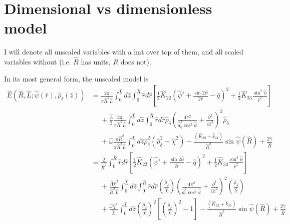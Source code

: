 \documentclass[12pt]{article}
\begin{document}


\section{Dimensional vs dimensionless model}
I will denote all unscaled variables with a hat over top of them, and all scaled variables without (i.e. $\hat{R}$ has units, $R$ does not).

In its most general form, the unscaled model is
\begin{align}\label{eq:generalunits}
\hat{E}(\hat{R},\hat{L};\hat{\psi}(\hat{r}),\hat{\rho}_{\delta}(\hat{z}))&=\frac{2\pi}{\pi\hat{R}^2\hat{L}}\int_0^{\hat{L}}d\hat{z}\int_0^{\hat{R}}\hat{r}d\hat{r}\left[\frac{1}{2}\hat{K}_{22}\left(\hat{\psi}'+\frac{\sin2\hat{\psi}}{2\hat{r}}-\hat{q}\right)^2+\frac{1}{2}\hat{K}_{33}\frac{\sin^4\hat{\psi}}{\hat{r}^2}\right]\nonumber\\
&\phantom{=}+\frac{\hat{\Lambda}}{2}\frac{2\pi}{\pi\hat{R}^2\hat{L}}\int_0^{\hat{L}}d\hat{z}\int_0^{\hat{R}}\hat{r}d\hat{r}\hat{\rho}_{\delta}\left(\frac{4\pi^2}{\hat{d}^2_0\cos^2\hat{\psi}}+\frac{\partial^2}{\partial\hat{z}^2}\right)^2\hat{\rho}_{\delta}\nonumber\\
&\phantom{=}+\hat{\omega}\frac{\pi\hat{R}^2}{\pi\hat{R}^2\hat{L}}\int_0^{\hat{L}}d\hat{z}\hat{\rho}_{\delta}^2\left(\hat{\rho}_{\delta}^2-\hat{\chi}^2\right)-\frac{(\hat{K}_{22}+\hat{k}_{24})}{\hat{R}^2}\sin\hat{\psi}(\hat{R})+\frac{2\hat{\gamma}}{\hat{R}}\nonumber\\
&=\frac{2}{\hat{R}^2}\int_0^{\hat{R}}\hat{r}d\hat{r}\left[\frac{1}{2}\hat{K}_{22}\left(\hat{\psi}'+\frac{\sin2\hat{\psi}}{2\hat{r}}-\hat{q}\right)^2+\frac{1}{2}\hat{K}_{33}\frac{\sin^4\hat{\psi}}{\hat{r}^2}\right]\nonumber\\
&\phantom{=}+\frac{\hat{\Lambda}\hat{\chi}^2}{\hat{R}^2\hat{L}}\int_0^{\hat{L}}d\hat{z}\int_0^{\hat{R}}\hat{r}d\hat{r}\left(\frac{\hat{\rho}_{\delta}}{\hat{\chi}}\right)\left(\frac{4\pi^2}{\hat{d}^2_0\cos^2\hat{\psi}}+\frac{\partial^2}{\partial\hat{z}^2}\right)^2\left(\frac{\hat{\rho}_{\delta}}{\hat{\chi}}\right)\nonumber\\
&\phantom{=}+\frac{\hat{\omega}\hat{\chi}^4}{\hat{L}}\int_0^{\hat{L}}d\hat{z}\left(\frac{\hat{\rho}_{\delta}}{\hat{\chi}}\right)^2\left[\left(\frac{\hat{\rho}_{\delta}}{\hat{\chi}}\right)^2-1\right]-\frac{(\hat{K}_{22}+\hat{k}_{24})}{\hat{R}^2}\sin\hat{\psi}(\hat{R})+\frac{2\hat{\gamma}}{\hat{R}}\nonumber\\
\end{align}
\end{document}
